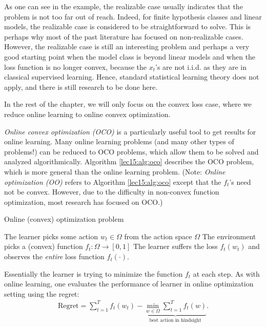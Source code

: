 As one can see in the example, the realizable case usually indicates that the problem is not too far out of reach. Indeed, for finite hypothesis classes and linear models, the realizable case is considered to be straightforward to solve. This is perhaps why most of the past literature has focused on non-realizable cases. However, the realizable case is still an interesting problem and perhaps a very good starting point when the model class is beyond linear models and when the loss function is no longer convex, because the $x_t$'s are not i.i.d. as they are in classical supervised learning. Hence, standard statistical learning theory does not apply, and there is still research to be done here.
 
In the rest of the chapter, we will only focus on the convex loss case, where we reduce online learning to online convex optimization. 
    

\textit{Online convex optimization (OCO)} is a particularly useful tool to get results for online learning. Many online learning problems (and many other types of problems!) can be reduced to OCO problems, which allow them to be solved and analyzed algorithmically. Algorithm \ref{lec15:alg:oco} describes the OCO problem, which is more general than the online learning problem. (Note: \textit{Online optimization (OO)} refers to Algorithm \ref{lec15:alg:oco} except that the $f_t$'s need not be convex. However, due to the difficulty in non-convex function optimization, most research has focused on OCO.)

    \begin{algorithm}
    \caption{Online (convex) optimization problem}
    \label{lec15:alg:oco}
     {
        The learner picks some action $w_t \in \Omega$ from the action space $\Omega$\;
        The environment picks a (convex) function $f_t: \Omega \to [0, 1]$\;
        The learner suffers the loss $f_t(w_t)$ and observes the \emph{entire} loss function $f_t(\cdot)$.
        }
    \end{algorithm}
    
Essentially the learner is trying to minimize the function $f_t$ at each step. As with online learning, one evaluates the performance of learner in online optimization setting using the regret:
\begin{align}
\text{Regret} = \sum_{t=1}^T f_t(w_t) - 
\underbrace{\min_{w \in \Omega} \sum_{t=1}^T f_t(w)}_\text{best action in hindsight}.
\end{align}

